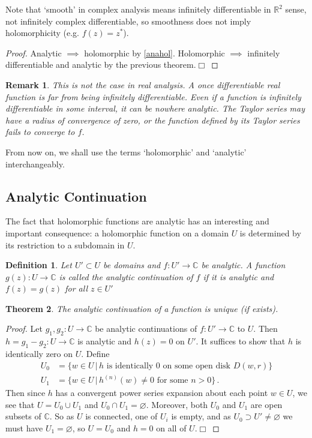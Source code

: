 \documentclass{article}
\theoremstyle{plain}\theoremheaderfont{\normalfont\itshape}\theorembodyfont{\rmfamily}\theoremseparator{.}\newtheorem*{rem}{Remark}\newtheorem*{ex}{Example}\newtheorem*{proof}{Proof}\newtheorem*{altp}{Alternative proof}
\theoremstyle{plain}\theoremheaderfont{\normalfont\bfseries}\theorembodyfont{\rmfamily}\theoremseparator{.}\newtheorem{thm}{Theorem}[section]\newtheorem{lem}[thm]{Lemma}\newtheorem{prop}[thm]{Proposition}\newtheorem*{cor}{Corollary}\newtheorem{defn}[thm]{Definition}\newtheorem{clm}[thm]{Claim}\newtheorem{clminproof}{Claim}
\theoremstyle{break}\theoremheaderfont{\normalfont\itshape}\theorembodyfont{\rmfamily}\theoremseparator{.\medskip}\newtheorem*{proofskip}{Proof}\newtheorem*{exs}{Examples}\newtheorem*{rems}{Remarks}
\theoremstyle{break}\theoremheaderfont{\normalfont\bfseries}\theorembodyfont{\rmfamily}\theoremseparator{.\medskip}\newtheorem{lemskip}[thm]{Lemma}\newtheorem{defnskip}[thm]{Definition}\newtheorem{propskip}[thm]{Proposition}\newtheorem{thmskip}[thm]{Theorem}
\numberwithin{equation}{section}
\newcommand{\qed}{\hfill\ensuremath{\Box}}
\begin{document}
	Note that `smooth' in complex analysis means infinitely differentiable in \(\mathbb{R}^2\) sense, not infinitely complex differentiable, so smoothness does not imply holomorphicity (e.g. \(f(z)=z^*\)).
	\begin{proof}
		Analytic \(\implies\) holomorphic by \cref{anahol}. Holomorphic \(\implies\) infinitely differentiable and analytic by the previous theorem.\qed
	\end{proof}
	\begin{rem}
		This is not the case in real analysis. A once differentiable real function is far from being infinitely differentiable. Even if a function is infinitely differentiable in some interval, it can be nowhere analytic. The Taylor series may have a radius of convergence of zero, or the function defined by its Taylor series fails to converge to \(f\).
	\end{rem}

	From now on, we shall use the terms `holomorphic' and `analytic' interchangeably.

	\subsection{Analytic Continuation}
	The fact that holomorphic functions are analytic has an interesting and important consequence: a holomorphic function on a domain \(U\) is determined by its restriction to a subdomain in \(U\).
	\begin{defn}
		Let \(U'\subset U\) be domains and \(f:U'\to\mathbb{C}\) be analytic. A function \(g(z):U\to\mathbb{C}\) is called the \textit{analytic continuation} of \(f\) if it is analytic and \(f(z)=g(z)\) for all \(z\in U'\)
	\end{defn}

	\begin{thm}
		The analytic continuation of a function is unique (if exists).
	\end{thm}
	\begin{proof}
		Let \(g_1,g_2:U\to\mathbb{C}\) be analytic continuations of \(f:U'\to\mathbb{C}\) to \(U\). Then \(h=g_1-g_2:U\to\mathbb{C}\) is analytic and \(h(z)=0\) on \(U'\). It suffices to show that \(h\) is identically zero on \(U\). Define
		\begin{align*}
			U_0&=\{w\in U\,|\,h\text{ is identically 0 on some open disk }D(w,r)\}\\
			U_1&=\{w\in U\,|\,h^{(n)}(w)\ne 0\text{ for some }n>0\}\,.
		\end{align*}
		Then since \(h\) has a convergent power series expansion about each point \(w\in U\), we see that \(U=U_0\cup U_1\) and \(U_0\cap U_1=\varnothing\). Moreover, both \(U_0\) and \(U_1\) are open subsets of \(\mathbb{C}\). So as \(U\) is connected, one of \(U_i\) is empty, and as \(U_0\supset U'\ne\varnothing\) we must have \(U_1=\varnothing\), so \(U=U_0\) and \(h=0\) on all of \(U\).\qed
	\end{proof}
\end{document}
